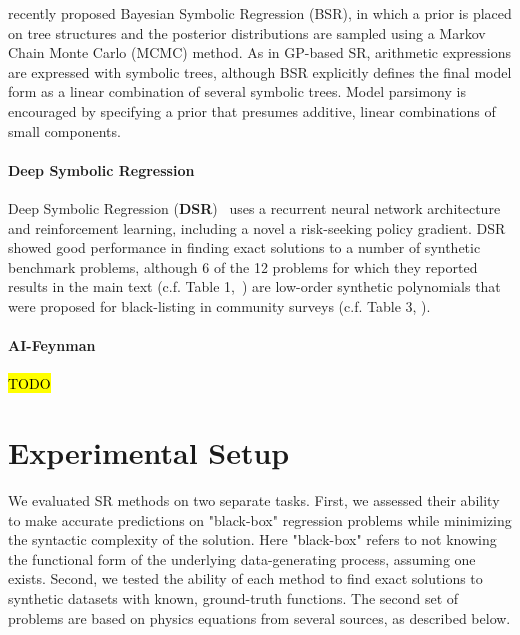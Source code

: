 \citet{jinBayesianSymbolicRegression2020} recently proposed Bayesian Symbolic Regression (BSR), in which a prior is placed on tree structures and the posterior distributions are sampled using a Markov Chain Monte Carlo (MCMC) method.   
As in GP-based SR, arithmetic expressions are expressed with symbolic trees, although BSR explicitly defines the final model form as a linear combination of several symbolic trees. 
Model parsimony is encouraged by specifying a prior that presumes additive, linear combinations of small components. 

\paragraph{Deep Symbolic Regression}
Deep Symbolic Regression (\textbf{DSR})~\cite{petersenDeepSymbolicRegression2020} uses a recurrent neural network architecture and reinforcement learning, including a novel a risk-seeking policy gradient. 
DSR showed good performance in finding exact solutions to a number of synthetic benchmark problems, although 6 of the 12 problems for which they reported results in the main text (c.f. Table 1,~\cite{petersenDeepSymbolicRegression2020}) are low-order synthetic polynomials that were proposed for black-listing in community surveys (c.f. Table 3, \citet{whiteBetterGPBenchmarks2012a}).  

\paragraph{AI-Feynman}
\hl{TODO}

\section{Experimental Setup}

We evaluated SR methods on two separate tasks. 
First, we assessed their ability to make accurate predictions on "black-box" regression problems while minimizing the syntactic complexity of the solution. 
Here "black-box" refers to not knowing the functional form of the underlying data-generating process, assuming one exists.   
Second, we tested the ability of each method to find exact solutions to synthetic datasets with known, ground-truth functions. 
The second set of problems are based on physics equations from several sources, as described below. 

